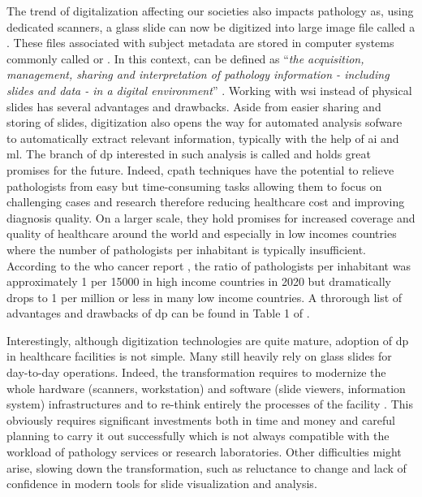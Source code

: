 The trend of digitalization affecting our societies also impacts pathology as, using dedicated scanners, a glass slide can now be digitized into large image file called a . These files associated with subject metadata are stored in computer systems commonly called  or . In this context,  can be defined as ``\textit{the acquisition, management, sharing and interpretation of pathology information - including slides and data - in a digital environment}'' \cite{doolan2019whatisdp}. Working with \acrshort{wsi} instead of physical slides has several advantages and drawbacks. Aside from easier sharing and storing of slides, digitization also opens the way for automated analysis sofware to automatically extract relevant information, typically with the help of \acrlong{ai} and \acrlong{ml}. The branch of \acrlong{dp} interested in such analysis is called  and holds great promises for the future. Indeed, \acrlong{cpath} techniques have the potential to relieve pathologists from easy but time-consuming tasks allowing them to focus on challenging cases and research therefore reducing healthcare cost and improving diagnosis quality. On a larger scale, they hold promises for increased coverage and quality of healthcare around the world and especially in low incomes countries where the number of pathologists per inhabitant is typically insufficient. According to the \acrshort{who} cancer report \cite{world2020report}, the ratio of pathologists per inhabitant was approximately 1 per 15000 in high income countries in 2020 but dramatically drops to 1 per million or less in many low income countries. A throrough list of advantages and drawbacks of \acrlong{dp} can be found in Table 1 of \cite{jahn2020digital}.

Interestingly, although digitization technologies are quite mature, adoption of \acrlong{dp} in healthcare facilities is not simple. Many still heavily rely on glass slides for day-to-day operations. Indeed, the transformation requires to modernize the whole hardware (scanners, workstation) and software (slide viewers, information system) infrastructures and to re-think entirely the processes of the facility \cite{temprana2022digipatics}. This obviously requires significant investments both in time and money and careful planning to carry it out successfully which is not always compatible with the workload of pathology services or research laboratories. Other difficulties might arise, slowing down the transformation, such as reluctance to change and lack of confidence in modern tools for slide visualization and analysis. 

